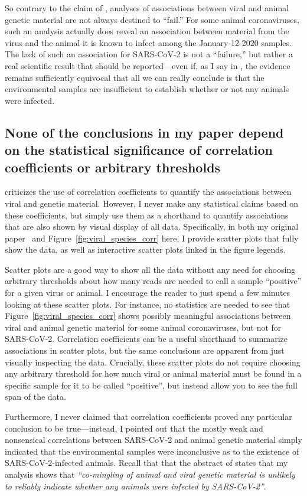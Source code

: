 \documentclass[9pt,twocolumn,twoside]{gsajnl_modified}
\begin{document}
So contrary to the claim of \citet{debarre2024what}, analyses of associations between viral and animal genetic material are not always destined to ``fail.''
For some animal coronaviruses, such an analysis actually does reveal an association between material from the virus and the animal it is known to infect among the January-12-2020 samples.
The lack of such an association for SARS-CoV-2 is not a ``failure,'' but rather a real scientific result that should be reported---even if, as I say in \citet{bloom2023association}, the evidence remains sufficiently equivocal that all we can really conclude is that the environmental samples are insufficient to establish whether or not any animals were infected.

\subsection{None of the conclusions in my paper depend on the statistical significance of correlation coefficients or arbitrary thresholds}
\citet{debarre2024what} criticizes the use of correlation coefficients to quantify the associations between viral and genetic material.
However, I never make any statistical claims based on these coefficients, but simply use them as a shorthand to quantify associations that are also shown by visual display of all data.
Specifically, in both my original paper~\citep{bloom2023association} and Figure~\ref{fig:viral_species_corr} here, I provide scatter plots that fully show the data, as well as interactive scatter plots linked in the figure legends.

Scatter plots are a good way to show all the data without any need for choosing arbitrary thresholds about how many reads are needed to call a sample ``positive'' for a given virus or animal.
I encourage the reader to just spend a few minutes looking at these scatter plots.
For instance, no statistics are needed to see that Figure~\ref{fig:viral_species_corr} shows possibly meaningful associations between viral and animal genetic material for some animal coronaviruses, but not for SARS-CoV-2.
Correlation coefficients can be a useful shorthand to summarize associations in scatter plots, but the same conclusions are apparent from just visually inspecting the data.
Crucially, these scatter plots do not require choosing any arbitrary threshold for how much viral or animal material must be found in a specific sample for it to be called ``positive'', but instead allow you to see the full span of the data.

Furthermore, I never claimed that correlation coefficients proved any particular conclusion to be true---instead, I pointed out that the mostly weak and nonsensical correlations between SARS-CoV-2 and animal genetic material simply indicated that the environmental samples were inconclusive as to the existence of SARS-CoV-2-infected animals.
Recall that that the abstract of \citet{bloom2023association} states that my analysis shows that \textit{``co-mingling of animal and viral genetic material is unlikely to reliably indicate whether any animals were infected by SARS-CoV-2''}.
\end{document}
